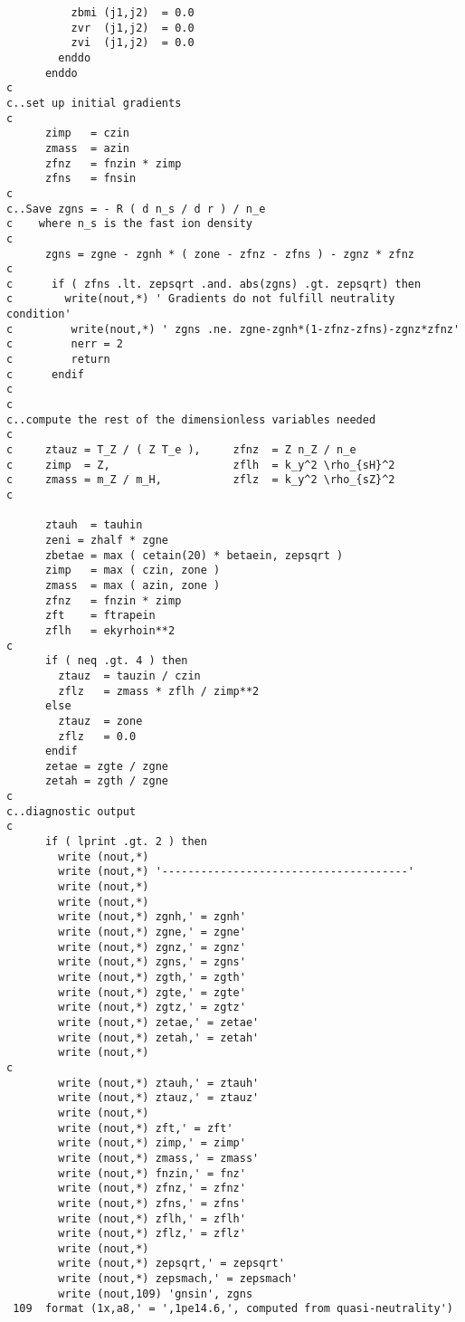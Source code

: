 \begin{verbatim}
          zbmi (j1,j2)  = 0.0
          zvr  (j1,j2)  = 0.0
          zvi  (j1,j2)  = 0.0
        enddo
      enddo
c
c..set up initial gradients
c
      zimp   = czin
      zmass  = azin
      zfnz   = fnzin * zimp
      zfns   = fnsin
c
c..Save zgns = - R ( d n_s / d r ) / n_e
c    where n_s is the fast ion density
c
      zgns = zgne - zgnh * ( zone - zfnz - zfns ) - zgnz * zfnz
c
c      if ( zfns .lt. zepsqrt .and. abs(zgns) .gt. zepsqrt) then
c        write(nout,*) ' Gradients do not fulfill neutrality condition'
c         write(nout,*) ' zgns .ne. zgne-zgnh*(1-zfnz-zfns)-zgnz*zfnz'
c         nerr = 2
c         return
c      endif 
c
c
c..compute the rest of the dimensionless variables needed
c
c     ztauz = T_Z / ( Z T_e ),     zfnz  = Z n_Z / n_e
c     zimp  = Z,                   zflh  = k_y^2 \rho_{sH}^2
c     zmass = m_Z / m_H,           zflz  = k_y^2 \rho_{sZ}^2
c

      ztauh  = tauhin
      zeni = zhalf * zgne
      zbetae = max ( cetain(20) * betaein, zepsqrt )
      zimp   = max ( czin, zone )
      zmass  = max ( azin, zone )
      zfnz   = fnzin * zimp
      zft    = ftrapein
      zflh   = ekyrhoin**2
c
      if ( neq .gt. 4 ) then
        ztauz  = tauzin / czin
        zflz   = zmass * zflh / zimp**2
      else
        ztauz  = zone
        zflz   = 0.0
      endif
      zetae = zgte / zgne
      zetah = zgth / zgne
c
c..diagnostic output
c
      if ( lprint .gt. 2 ) then
        write (nout,*)
        write (nout,*) '--------------------------------------'
        write (nout,*)
        write (nout,*)
        write (nout,*) zgnh,' = zgnh'
        write (nout,*) zgne,' = zgne'
        write (nout,*) zgnz,' = zgnz'
        write (nout,*) zgns,' = zgns'
        write (nout,*) zgth,' = zgth'
        write (nout,*) zgte,' = zgte'
        write (nout,*) zgtz,' = zgtz'
        write (nout,*) zetae,' = zetae'
        write (nout,*) zetah,' = zetah'
        write (nout,*)
c
        write (nout,*) ztauh,' = ztauh'
        write (nout,*) ztauz,' = ztauz'
        write (nout,*)
        write (nout,*) zft,' = zft'
        write (nout,*) zimp,' = zimp'
        write (nout,*) zmass,' = zmass'
        write (nout,*) fnzin,' = fnz'
        write (nout,*) zfnz,' = zfnz'
        write (nout,*) zfns,' = zfns'
        write (nout,*) zflh,' = zflh'
        write (nout,*) zflz,' = zflz'
        write (nout,*)
        write (nout,*) zepsqrt,' = zepsqrt'
        write (nout,*) zepsmach,' = zepsmach'
        write (nout,109) 'gnsin', zgns
 109  format (1x,a8,' = ',1pe14.6,', computed from quasi-neutrality')


\end{verbatim}
